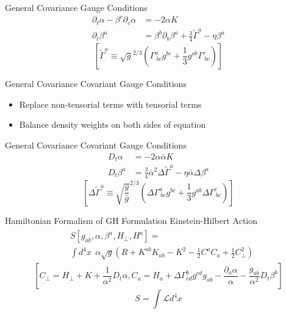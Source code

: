 \documentclass[xcolor=dvipsnames]{beamer}
\begin{document}
	\begin{frame}{General Covariance}
		Gauge Conditions
		\pause
		\begin{align*}
			\partial_{t}\alpha - \beta^{c}\partial_{c}\alpha &= -2\alpha K\\
			\partial_{t}\beta^{a} &= \beta^{b}\partial_{b}\beta^{a} + \frac{3}{4}{\tilde \Gamma}^{a} - \eta \beta^{a}
		\end{align*}
		\tiny
		\[
		\left[{\tilde \Gamma}^{a} \equiv \sqrt{g}^{2/3}\left(\Gamma^{a}_{~bc}g^{bc} + \frac{1}{3}g^{ab}\Gamma^{c}_{~bc}\right)\right]
		\]
	\end{frame}
	\begin{frame}{General Covariance}
		Covariant Gauge Conditions
		\pause
		\begin{itemize}
			\item{Replace non-tensorial terms with tensorial terms}
			\item{Balance density weights on both sides of equation}
		\end{itemize}
	\end{frame}
	\begin{frame}{General Covariance}
		Covariant Gauge Conditions
		\begin{align*}
			D_{t}\alpha &= -2\alpha{\bar \alpha}K\\
			D_{t}\beta^{a} &= \frac{3}{4}{\bar \alpha}^{2}\Delta {\tilde \Gamma}^{a} - \eta {\bar \alpha}\Delta\beta^{a}  
		\end{align*}
		\tiny
		\[
			\left[\Delta {\tilde \Gamma}^{a} \equiv \sqrt{\frac{g}{{\bar g}}}^{2/3}\left(\Delta \Gamma^{a}_{~bc}g^{bc} + \frac{1}{3}g^{ab}\Delta \Gamma^{c}_{~bc}\right)\right]
		\]
	\end{frame}
	\begin{frame}{Hamiltonian Formalism of GH Formulation}
		Einstein-Hilbert Action
		\begin{align*}
			\begin{split}
				&S\left[g_{ab}, \alpha, \beta^{a}, H_{\perp}, H^{a}\right] =\\&\int d^{4}x~~\alpha \sqrt{g} \left( R + K^{ab}K_{ab} - K^{2} - \frac{1}{2}C^{a}C_{a} + \frac{1}{2}C_{\perp}^{2}\right)
			\end{split}
		\end{align*}
		\tiny
		\[		
		\left[ C_{\perp} = H_{\perp} + K + \frac{1}{\alpha^{2}}D_{t}\alpha, C_{a} = H_{a} + \Delta \Gamma^{b}_{cd}g^{cd}g_{ab} - \frac{\partial_{a}\alpha}{\alpha} - \frac{g_{ab}}{\alpha^2}D_{t}\beta^{b} \right]
		\]
		\pause
		\normalsize
		\[
		S = \int\mathscr{L}d^{4}x
		\]
	\end{frame}
\end{document}
